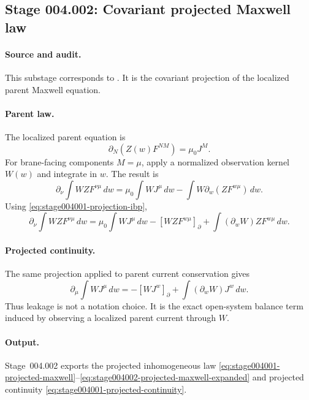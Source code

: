 \subsection*{Stage 004.002: Covariant projected Maxwell law}
\label{subsec:stage004002-projected-maxwell-covariant}

\paragraph{Source and audit.}
This substage corresponds to
.
It is the covariant projection of the localized parent Maxwell equation.

\paragraph{Parent law.}
The localized parent equation is
\begin{equation}
\label{eq:stage004002-parent-maxwell}
\partial_N\!\left(Z(w)F^{NM}\right)=\mu_0J^M .
\end{equation}
For brane-facing components \(M=\mu\), apply a normalized observation kernel
\(W(w)\) and integrate in \(w\).  The result is
\begin{equation}
\label{eq:stage004001-projected-maxwell}
\partial_\nu\!\int WZ F^{\nu\mu}\,dw
=
\mu_0\int WJ^\mu\,dw
-\int W\partial_w(ZF^{w\mu})\,dw.
\end{equation}
Using \eqref{eq:stage004001-projection-ibp},
\begin{equation}
\label{eq:stage004002-projected-maxwell-expanded}
\partial_\nu\!\int WZ F^{\nu\mu}\,dw
=
\mu_0\int WJ^\mu\,dw
-[WZF^{w\mu}]_{\partial}
+\int (\partial_wW)ZF^{w\mu}\,dw .
\end{equation}

\paragraph{Projected continuity.}
The same projection applied to parent current conservation gives
\begin{equation}
\label{eq:stage004001-projected-continuity}
\partial_\mu\!\int WJ^\mu\,dw
=-[WJ^w]_{\partial}+\int(\partial_wW)J^w\,dw .
\end{equation}
Thus leakage is not a notation choice.  It is the exact open-system balance
term induced by observing a localized parent current through \(W\).

\paragraph{Output.}
Stage~004.002 exports the projected inhomogeneous law
\eqref{eq:stage004001-projected-maxwell}--\eqref{eq:stage004002-projected-maxwell-expanded}
and projected continuity \eqref{eq:stage004001-projected-continuity}.

